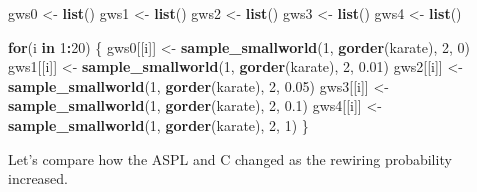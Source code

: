 \documentclass[
]{book}
\newenvironment{Shaded}{\begin{snugshade}}{\end{snugshade}}
\newcommand{\ControlFlowTok}[1]{\textcolor[rgb]{0.13,0.29,0.53}{\textbf{#1}}}
\newcommand{\DecValTok}[1]{\textcolor[rgb]{0.00,0.00,0.81}{#1}}
\newcommand{\FloatTok}[1]{\textcolor[rgb]{0.00,0.00,0.81}{#1}}
\newcommand{\FunctionTok}[1]{\textcolor[rgb]{0.13,0.29,0.53}{\textbf{#1}}}
\newcommand{\NormalTok}[1]{#1}
\newcommand{\OtherTok}[1]{\textcolor[rgb]{0.56,0.35,0.01}{#1}}
\newcommand{\SpecialCharTok}[1]{\textcolor[rgb]{0.81,0.36,0.00}{\textbf{#1}}}
\begin{document}
\begin{Shaded}
\begin{Highlighting}[]
\NormalTok{gws0 }\OtherTok{\textless{}{-}} \FunctionTok{list}\NormalTok{()}
\NormalTok{gws1 }\OtherTok{\textless{}{-}} \FunctionTok{list}\NormalTok{()}
\NormalTok{gws2 }\OtherTok{\textless{}{-}} \FunctionTok{list}\NormalTok{()}
\NormalTok{gws3 }\OtherTok{\textless{}{-}} \FunctionTok{list}\NormalTok{()}
\NormalTok{gws4 }\OtherTok{\textless{}{-}} \FunctionTok{list}\NormalTok{()}

\ControlFlowTok{for}\NormalTok{(i }\ControlFlowTok{in} \DecValTok{1}\SpecialCharTok{:}\DecValTok{20}\NormalTok{) \{}
\NormalTok{  gws0[[i]] }\OtherTok{\textless{}{-}} \FunctionTok{sample\_smallworld}\NormalTok{(}\DecValTok{1}\NormalTok{, }\FunctionTok{gorder}\NormalTok{(karate), }\DecValTok{2}\NormalTok{, }\DecValTok{0}\NormalTok{)}
\NormalTok{  gws1[[i]] }\OtherTok{\textless{}{-}} \FunctionTok{sample\_smallworld}\NormalTok{(}\DecValTok{1}\NormalTok{, }\FunctionTok{gorder}\NormalTok{(karate), }\DecValTok{2}\NormalTok{, }\FloatTok{0.01}\NormalTok{)}
\NormalTok{  gws2[[i]] }\OtherTok{\textless{}{-}} \FunctionTok{sample\_smallworld}\NormalTok{(}\DecValTok{1}\NormalTok{, }\FunctionTok{gorder}\NormalTok{(karate), }\DecValTok{2}\NormalTok{, }\FloatTok{0.05}\NormalTok{)}
\NormalTok{  gws3[[i]] }\OtherTok{\textless{}{-}} \FunctionTok{sample\_smallworld}\NormalTok{(}\DecValTok{1}\NormalTok{, }\FunctionTok{gorder}\NormalTok{(karate), }\DecValTok{2}\NormalTok{, }\FloatTok{0.1}\NormalTok{)}
\NormalTok{  gws4[[i]] }\OtherTok{\textless{}{-}} \FunctionTok{sample\_smallworld}\NormalTok{(}\DecValTok{1}\NormalTok{, }\FunctionTok{gorder}\NormalTok{(karate), }\DecValTok{2}\NormalTok{, }\DecValTok{1}\NormalTok{)}
\NormalTok{\}}
\end{Highlighting}
\end{Shaded}

Let's compare how the ASPL and C changed as the rewiring probability increased.
\end{document}
